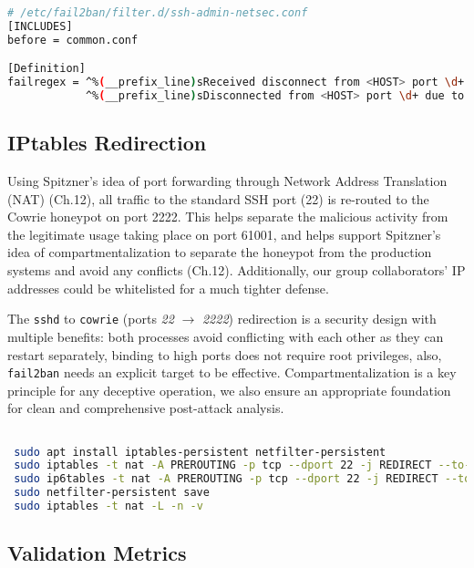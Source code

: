 \documentclass{cls/ULBreport}
\begin{document}
        \begin{lstlisting}[language=bash,caption={Regex Filter Against Key-Based Attacks}]
 # /etc/fail2ban/filter.d/ssh-admin-netsec.conf
[INCLUDES]
before = common.conf

[Definition]
failregex = ^%(__prefix_line)sReceived disconnect from <HOST> port \d+: Too many authentication failures
            ^%(__prefix_line)sDisconnected from <HOST> port \d+ due to: Authentication failed for .* publickey
        \end{lstlisting}
        
        
        \subsection{IPtables Redirection}
        Using Spitzner's idea of port forwarding through Network Address Translation (NAT) (Ch.12), all traffic to the standard SSH port (22) is re-routed to the Cowrie honeypot on port 2222. This helps separate the malicious activity from the legitimate usage taking place on port 61001, and helps support Spitzner's idea of compartmentalization to separate the honeypot from the production systems and avoid any conflicts (Ch.12). Additionally, our group collaborators' IP addresses could be whitelisted for a much tighter defense. 
        
        The \texttt{sshd} to \texttt{cowrie} ({ports \textit{22}} $\rightarrow$ \textit{2222}) redirection is a security design with multiple benefits: both processes avoid conflicting with each other as they can restart separately, binding to high ports does not require root privileges, also, \texttt{fail2ban} needs an explicit target to be effective. Compartmentalization is a key principle for any deceptive operation, we also ensure an appropriate foundation for clean and comprehensive post-attack analysis.
        \begin{lstlisting}[language=bash,caption={Traffic Redirection to Cowrie}]

 sudo apt install iptables-persistent netfilter-persistent
 sudo iptables -t nat -A PREROUTING -p tcp --dport 22 -j REDIRECT --to-port 2222
 sudo ip6tables -t nat -A PREROUTING -p tcp --dport 22 -j REDIRECT --to-port 2222
 sudo netfilter-persistent save
 sudo iptables -t nat -L -n -v
        \end{lstlisting}
        

        
        \subsection{Validation Metrics}  
        \label{sec:validation}  
        
\end{document}

